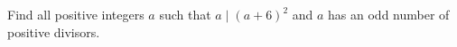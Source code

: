 Find all positive integers $a$ such that $a\mid(a+6)^2$ and $a$ has an odd number of positive divisors.
